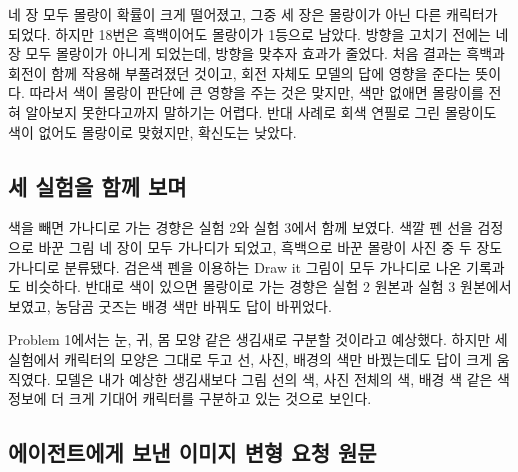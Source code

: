 \documentclass[11pt]{article}
\begin{document}
네 장 모두 몰랑이 확률이 크게 떨어졌고, 그중 세 장은 몰랑이가 아닌 다른
캐릭터가 되었다. 하지만 18번은 흑백이어도 몰랑이가 1등으로 남았다.
방향을 고치기 전에는 네 장 모두 몰랑이가 아니게 되었는데, 방향을 맞추자
효과가 줄었다. 처음 결과는 흑백과 회전이 함께 작용해 부풀려졌던 것이고,
회전 자체도 모델의 답에 영향을 준다는 뜻이다. 따라서 색이 몰랑이 판단에
큰 영향을 주는 것은 맞지만, 색만 없애면 몰랑이를 전혀 알아보지 못한다고까지
말하기는 어렵다. 반대 사례로 회색 연필로 그린 몰랑이도 색이 없어도
몰랑이로 맞혔지만, 확신도는 낮았다.

\subsection*{세 실험을 함께 보며}
색을 빼면 가나디로 가는 경향은 실험 2와 실험 3에서 함께 보였다. 색깔 펜 선을
검정으로 바꾼 그림 네 장이 모두 가나디가 되었고, 흑백으로 바꾼 몰랑이 사진 중
두 장도 가나디로 분류됐다. 검은색 펜을 이용하는 Draw it 그림이 모두 가나디로 나온
기록과도 비슷하다. 반대로 색이 있으면 몰랑이로 가는 경향은 실험 2 원본과 실험 3
원본에서 보였고, 농담곰 굿즈는 배경 색만 바꿔도 답이 바뀌었다.

Problem 1에서는 눈, 귀, 몸 모양 같은 생김새로 구분할 것이라고 예상했다.
하지만 세 실험에서 캐릭터의 모양은 그대로 두고 선, 사진, 배경의 색만 바꿨는데도 답이 크게
움직였다. 모델은 내가 예상한 생김새보다 그림 선의 색, 사진 전체의 색, 배경 색 같은
색 정보에 더 크게 기대어 캐릭터를 구분하고 있는 것으로 보인다.

\subsection*{에이전트에게 보낸 이미지 변형 요청 원문}
\end{document}
